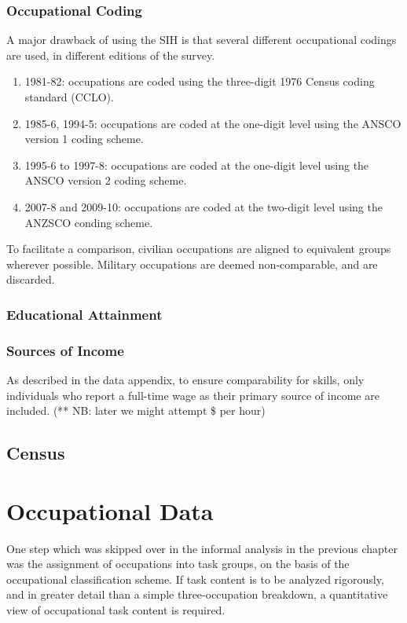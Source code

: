 \subsubsection{Occupational Coding}

A major drawback of using the SIH is that several different occupational codings are used, in different editions of the survey. 
\begin{enumerate}
\item 1981-82: occupations are coded using the three-digit 1976 Census coding standard (CCLO).
\item 1985-6, 1994-5: occupations are coded at the one-digit level using the ANSCO version 1 coding scheme.
\item 1995-6 to 1997-8: occupations are coded at the one-digit level using the ANSCO version 2 coding scheme.
\item 2007-8 and 2009-10: occupations are coded at the two-digit level using the ANZSCO conding scheme.
\end{enumerate}
To facilitate a comparison, civilian occupations are aligned to equivalent groups wherever possible. Military occupations are deemed non-comparable, and are discarded.

\subsubsection{Educational Attainment}


\subsubsection{Sources of Income}

As described in the data appendix, to ensure comparability for skills, only individuals who report a full-time wage as their primary source of income are included. (** NB: later we might attempt \$ per hour)



\subsection{Census}

\section{Occupational Data}

One step which was skipped over in the informal analysis in the previous chapter was the assignment of occupations into task groups, on the basis of the occupational classification scheme. If task content is to be analyzed rigorously, and in greater detail than a simple three-occupation breakdown, a quantitative view of occupational task content is required. 


